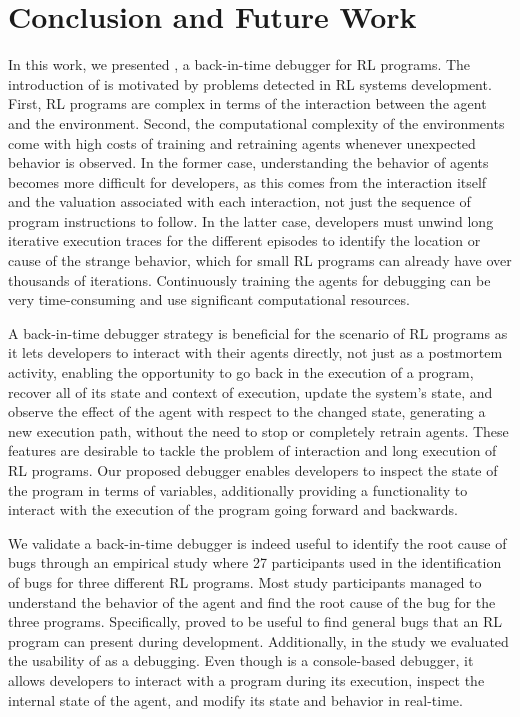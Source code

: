 
\section{Conclusion and Future Work}
\label{sec:conclusion}

In this work, we presented \flik, a back-in-time debugger for \ac{RL} programs. The introduction of \flik 
is motivated by problems detected in \ac{RL} systems development. First, \ac{RL} programs are 
complex in terms of the interaction between the agent and the environment. Second, the computational 
complexity of the environments come with high costs of training and retraining agents whenever 
unexpected behavior is observed. 
In the former case, understanding the behavior of agents becomes more difficult for developers, as this 
comes from the interaction itself and the valuation associated with each interaction, not just the 
sequence of program instructions to follow. In the latter case, developers must unwind long iterative 
execution traces for the different episodes to identify the location or cause of the strange behavior, 
which for small \ac{RL} programs can already have over thousands of iterations. Continuously training 
the agents for debugging can be very time-consuming and use significant computational resources.

A back-in-time debugger strategy is beneficial for the scenario of \ac{RL} programs as it lets 
developers to interact with their agents directly, not just as a postmortem activity, enabling the 
opportunity to go back in the execution of a program, recover all of its state and context of execution, 
update the system's state, and observe the effect of the agent with respect to the changed state, 
generating a new execution path, without the need to stop or completely retrain agents. These features 
are desirable to tackle the problem of interaction and long execution of \ac{RL} programs. Our proposed 
debugger enables developers to inspect the state of the program in terms of variables, additionally 
providing a functionality to interact with the execution of the program going forward and backwards.

We validate a back-in-time debugger is indeed useful to identify the root cause of bugs through an 
empirical study where 27 participants used \flik in the identification of bugs for three different \ac{RL} 
programs. Most study participants managed to understand the behavior of the agent and find the root 
cause of the bug for the three programs. Specifically, \flik proved  to be useful to find general bugs that 
an \ac{RL} program can present during development. 
Additionally, in the study we evaluated the usability of \flik as a debugging. Even though \flik is a 
console-based debugger, it allows developers to interact with a program during its execution, inspect 
the internal state of the agent, and modify its state and behavior in real-time. 

